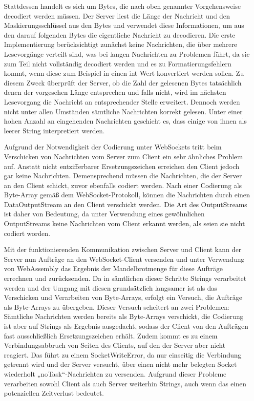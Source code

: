 \documentclass[12pt, onecolumn, notitlepage]{scrartcl}
\begin{document}
Stattdessen handelt es sich um Bytes, die nach oben genannter Vorgehensweise decodiert werden müssen. Der Server liest die Länge der Nachricht und den Maskierungsschlüssel aus den Bytes und verwendet diese Informationen, um aus den darauf folgenden Bytes die eigentliche Nachricht zu decodieren. Die erste Implementierung berücksichtigt zunächst keine Nachrichten, die über mehrere Lesevorgänge verteilt sind, was bei langen Nachrichten zu Problemen führt, da sie zum Teil nicht vollständig decodiert werden und es zu Formatierungsfehlern kommt, wenn diese zum Beispiel in einen int-Wert konvertiert werden sollen. Zu diesem Zweck überprüft der Server, ob die Zahl der gelesenen Bytes tatsächlich denen der vorgesehen Länge entsprechen und falls nicht, wird im nächsten Lesevorgang die Nachricht an entsprechender Stelle erweitert. Dennoch werden nicht unter allen Umständen sämtliche Nachrichten korrekt gelesen. Unter einer hohen Anzahl an eingehenden Nachrichten geschieht es, dass einige von ihnen als leerer String interpretiert werden. \par

Aufgrund der Notwendigkeit der Codierung unter WebSockets tritt beim Verschicken von Nachrichten vom Server zum Client ein sehr ähnliches Problem auf. Anstatt nicht entzifferbarer Ersetzungszeichen erreichen den Client jedoch gar keine Nachrichten. Demensprechend müssen die Nachrichten, die der Server an den Client schickt, zuvor ebenfalls codiert werden. Nach einer Codierung als Byte-Array gemäß dem WebSocket-Protokoll, können die Nachrichten durch einen DataOutputStream an den Client verschickt werden. Die Art des OutputStreams ist daher von Bedeutung, da unter Verwendung eines gewöhnlichen OutputStreams keine Nachrichten vom Client erkannt werden, als seien sie nicht codiert worden. \par

Mit der funktionierenden Kommunikation zwischen Server und Client kann der Server nun Aufträge an den WebSocket-Client versenden und unter Verwendung von WebAssembly das Ergebnis der Mandelbrotmenge für diese Aufträge errechnen und zurücksenden. Da in sämtlichen dieser Schritte Strings verarbeitet werden und der Umgang mit diesen grundsätzlich langsamer ist als das Verschicken und Verarbeiten von Byte-Arrays, erfolgt ein Versuch, die Aufträge als Byte-Arrays zu übergeben. Dieser Versuch scheitert an zwei Problemen: Sämtliche Nachrichten werden bereits als Byte-Arrays verschickt, die Codierung ist aber auf Strings als Ergebnis ausgedacht, sodass der Client von den Aufträgen fast ausschließlich Ersetzungszeichen erhält. Zudem kommt es zu einem Verbindungsabbruch von Seiten des Clients, auf den der Server aber nicht reagiert. Das führt zu einem SocketWriteError, da nur einseitig die Verbindung getrennt wird und der Server versucht, über einen nicht mehr belegten Socket wiederholt „noTask“-Nachrichten zu versenden. Aufgrund dieser Probleme verarbeiten sowohl Client als auch Server weiterhin Strings, auch wenn das einen potenziellen Zeitverlust bedeutet. \par
\end{document}
